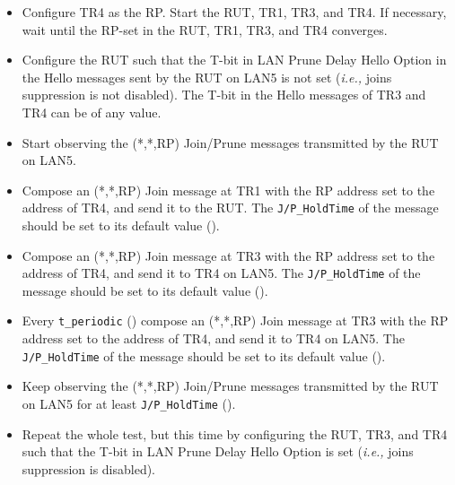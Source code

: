 \documentclass[11pt]{report}
\newcommand{\ie}{\emph{i.e.,}\xspace}
\begin{document}

\begin{itemize}

  \item Configure TR4 as the RP. Start the RUT, TR1, TR3, and TR4. If
  necessary, wait until the RP-set in the RUT, TR1, TR3, and TR4
  converges.

  \item Configure the RUT such that the T-bit in LAN Prune Delay Hello
  Option in the Hello messages sent by the RUT on LAN5 is not set (\ie joins
  suppression is not disabled). The T-bit in the Hello messages of TR3 and TR4
  can be of any value.

  \item Start observing the (*,*,RP) Join/Prune messages transmitted by the
  RUT on LAN5.

  \item Compose an (*,*,RP) Join message at TR1 with the RP address set to the
  address of TR4, and send it to the RUT. 
  The \verb=J/P_HoldTime= of the message should be set to its default
  value ({\PimsmJPHoldTime}).

  \item Compose an (*,*,RP) Join message at TR3 with the RP address set to the
  address of TR4, and send it to TR4 on LAN5.
  The \verb=J/P_HoldTime= of the message should be set to its default
  value ({\PimsmJPHoldTime}).

  \item Every \verb=t_periodic= ({\PimsmTPeriodic}) compose an (*,*,RP) Join
  message at TR3 with the RP address set to the address of TR4, and send it to
  TR4 on LAN5.
  The \verb=J/P_HoldTime= of the message should be set to its default
  value ({\PimsmJPHoldTime}).

  \item Keep observing the (*,*,RP) Join/Prune messages transmitted by the
  RUT on LAN5 for at least \verb=J/P_HoldTime= ({\PimsmJPHoldTime}).

  \item Repeat the whole test, but this time by configuring the RUT, TR3, and
  TR4 such that the T-bit in LAN Prune Delay Hello Option is set (\ie joins
  suppression is disabled).

\end{itemize}

\end{document}
